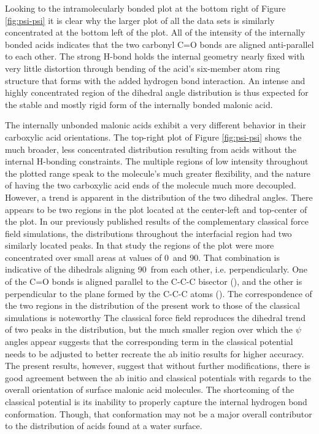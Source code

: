 Looking to the intramolecularly bonded plot at the bottom right of Figure \ref{fig:psi-psi} it is clear why the larger plot of all the data sets is similarly concentrated at the bottom left of the plot. All of the intensity of the internally bonded acids indicates that the two carbonyl C=O bonds are aligned anti-parallel to each other. The strong H-bond holds the internal geometry nearly fixed with very little distortion through bending of the acid's six-member atom ring structure that forms with the added hydrogen bond interaction. An intense and highly concentrated region of the dihedral angle distribution is thus expected for the stable and mostly rigid form of the internally bonded malonic acid.

The internally unbonded malonic acids exhibit a very different behavior in their carboxylic acid orientations. The top-right plot of Figure \ref{fig:psi-psi} shows the much broader, less concentrated distribution resulting from acids without the internal H-bonding constraints. The multiple regions of low intensity throughout the plotted range speak to the molecule's much greater flexibility, and the nature of having the two carboxylic acid ends of the molecule much more decoupled. However, a trend is apparent in the distribution of the two dihedral angles. There appears to be two regions in the plot located at the center-left and top-center of the plot. In our previously published results of the complementary classical force field simulations,\cite{Blower2012} the \psipsi distributions throughout the interfacial region had two similarly located peaks. In that study the regions of the plot were more concentrated over small areas at \psipsi values of 0\degr~and 90\degr. That combination is indicative of the dihedrals aligning 90\degr~from each other, i.e. perpendicularly. One of the C=O bonds is aligned parallel to the C-C-C bisector (\degr), and the other is perpendicular to the plane formed by the C-C-C atoms (\degr). The correspondence of the two regions in the distribution of the present work to those of the classical simulations is noteworthy The classical force field reproduces the dihedral trend of two peaks in the distribution, but the much smaller region over which the $\psi$ angles appear suggests that the corresponding term in the classical potential needs to be adjusted to better recreate the ab initio results for higher accuracy. The present results, however, suggest that without further modifications, there is good agreement between the ab initio and classical potentials with regards to the overall orientation of surface malonic acid molecules. The shortcoming of the classical potential is its inability to properly capture the internal hydrogen bond conformation. Though, that conformation may not be a major overall contributor to the distribution of acids found at a water surface.

